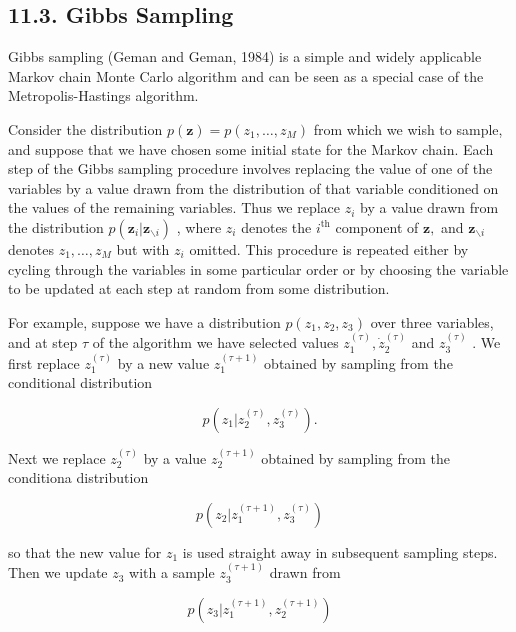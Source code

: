 \documentclass[
  10
]{article}
\begin{document}
\subsection{11.3. Gibbs Sampling}\label{gibbs-sampling}

Gibbs sampling (Geman and Geman, 1984) is a simple and widely applicable
Markov chain Monte Carlo algorithm and can be seen as a special case of
the Metropolis-Hastings algorithm.

Consider the distribution
\(p ( \mathbf { z } ) = p ( z _ { 1 } , \dots , z _ { M } )\) from which
we wish to sample, and suppose that we have chosen some initial state
for the Markov chain. Each step of the Gibbs sampling procedure involves
replacing the value of one of the variables by a value drawn from the
distribution of that variable conditioned on the values of the remaining
variables. Thus we replace \(z _ { i }\) by a value drawn from the
distribution
\(p ( \boldsymbol { z } _ { i } | \mathbf { z } _ { \backslash i } )\) ,
where \(z _ { i }\) denotes the \(i ^ { \mathrm { t h } }\) component of
\(\mathbf { z } ,\) and \(\mathbf { z } _ { \backslash i }\) denotes
\(z _ { 1 } , \dots , z _ { M }\) but with \(z _ { i }\) omitted. This
procedure is repeated either by cycling through the variables in some
particular order or by choosing the variable to be updated at each step
at random from some distribution.

For example, suppose we have a distribution
\(p ( z _ { 1 } , z _ { 2 } , z _ { 3 } )\) over three variables, and at
step \(\tau\) of the algorithm we have selected values
\(z _ { 1 } ^ { ( \tau ) } , \dot { z } _ { 2 } ^ { ( \tau ) }\) and
\(z _ { 3 } ^ { ( \tau ) }\) . We first replace
\(z _ { 1 } ^ { ( \tau ) }\) by a new value
\(z _ { 1 } ^ { ( \tau + 1 ) }\) obtained by sampling from the
conditional distribution

\[
p (z _ {1} | z _ {2} ^ {(\tau)}, z _ {3} ^ {(\tau)}).\tag{11.46}
\]

Next we replace \(z _ { 2 } ^ { ( \tau ) }\) by a value
\(z _ { 2 } ^ { ( \tau + 1 ) }\) obtained by sampling from the
conditiona distribution

\[
p (z _ {2} | z _ {1} ^ {(\tau + 1)}, z _ {3} ^ {(\tau)})\tag{11.47}
\]

so that the new value for \(z _ { 1 }\) is used straight away in
subsequent sampling steps. Then we update \(z _ { 3 }\) with a sample
\(z _ { 3 } ^ { ( \tau + 1 ) }\) drawn from

\[
p (z _ {3} | z _ {1} ^ {(\tau + 1)}, z _ {2} ^ {(\tau + 1)})\tag{11.48}
\]
\end{document}
